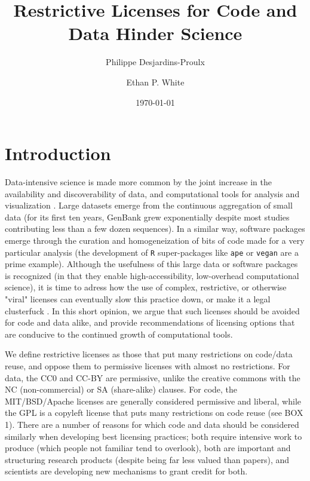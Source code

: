 \documentclass[letterpaper]{article}
\begin{document}
\title{Restrictive Licenses for Code and Data Hinder Science}
\author[0,1,2]{Philippe Desjardins-Proulx}
\author[3]{Ethan P. White}
\date{\today}
\maketitle

\section{Introduction}

Data-intensive science is made more common by the joint increase in the availability
and discoverability of data, and computational tools for analysis and visualization
\cite{hey09}. Large datasets emerge from the continuous aggregation of small data
(for its first ten years, GenBank grew exponentially despite most studies contributing
less than a few dozen sequences). In a similar way, software packages emerge through
the curation and homogeneization of bits of code made for a very particular analysis
(the development of \texttt{R} super-packages like \texttt{ape} or \texttt{vegan} are
a prime example). Although the usefulness of this large data or software packages is
recognized (in that they enable high-accessibility, low-overhead computational science),
it is time to adress how the use of complex, restrictive, or otherwise "viral" licenses
can eventually slow this practice down, or make it a legal clusterfuck \cite{mor12}.
In this short opinion, we argue that such licenses should be avoided for code and data
alike, and provide recommendations of licensing options that are conducive to the
continued growth of computational tools.

We define restrictive licenses as those that put many restrictions on code/data
reuse, and oppose them to permissive licenses with almost no restrictions. For
data, the CC0 and CC-BY are permissive, unlike the creative commons with the NC
(non-commercial) or SA (share-alike) clauses. 
For code, the MIT/BSD/Apache
licenses are generally considered permissive and liberal, while the GPL is a
copyleft license that puts many restrictions on code reuse (see BOX 1). There are a number
of reasons for which code and data should be considered similarly when developing best licensing practices;
both require intensive work to produce (which people not familiar tend to overlook),
both are important and structuring research products (despite being far less valued than
papers), and scientists are developing new mechanisms to grant credit for both.
\end{document}
